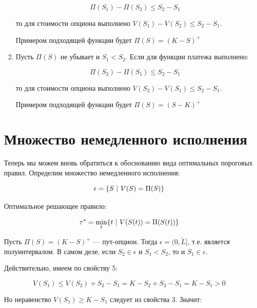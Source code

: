 \documentclass[a4paper,12pt]{article}
\theoremstyle{definition}
\begin{document}
\begin{enumerate}
    \begin{equation*}
        \Pi (S_1) - \Pi (S_2) \le S_2 - S_1
    \end{equation*}
    
    то для стоимости опциона выполнено $V (S_1) - V (S_2) \le S_2 - S_1$.
    
    Примером подходящей функции будет $\Pi (S) = (K - S)^{+}$
    
    \item Пусть $\Pi (S)$ не убывает и $S_1 < S_2$. Если для функции платежа выполнено:

    \begin{equation*}
        \Pi (S_2) - \Pi (S_1) \le S_2 - S_1
    \end{equation*}
    
    то для стоимости опциона выполнено $V (S_2) - V (S_1) \le S_2 - S_1$.
    
    Примером подходящей функции будет $\Pi (S) = (S - K)^{+}$
\end{enumerate}

\section{Множество немедленного исполнения}\label{sec:immediate_execution}

Теперь мы можем вновь обратиться к обоснованию вида оптимальных пороговых правил. Определим множество немедленного исполнения:

\begin{equation*}
    \epsilon = \{S\textup{ | }V(S) = \Pi (S)\}
\end{equation*}

Оптимальное решающее правило:

\begin{equation*}
    \tau^{*} = \min\limits_{t} \{t\textup{ | }V(S(t)) = \Pi (S(t)) \}
\end{equation*}

Пусть $\Pi (S) = (K - S)^{+}$ --- пут-опцион. Тогда $\epsilon = (0, \tilde{L}]$, т.е. является полуинтервалом. В самом деле, если $S_2 \in \epsilon$ и $S_1 < S_2$, то и $S_1 \in \epsilon$. 

Действительно, имеем по свойству 5:

\begin{equation*}
    V (S_1) \le V(S_2) + S_2 - S_1 = K - S_2 + S_2 - S_1 = K - S_1 > 0
\end{equation*}

Но неравенство $V(S_1) \ge K - S_1$ следует из свойства 3. Значит:
\end{document}
